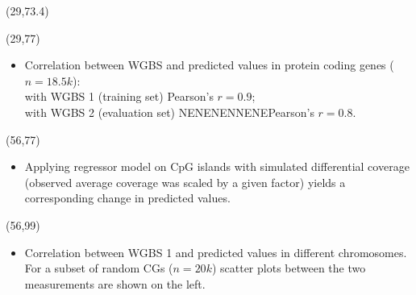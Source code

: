 \documentclass[a0,50pt]{a0poster}
\def\SectionTitle#1{\noindent{\huge\color{fontMain2} #1}}
\begin{document}
    \begin{textblock}{25}(29,73.4)
        \SectionTitle{Results}
    \end{textblock}

    \begin{textblock}{25}(29,77)
        \Large
        \begin{itemize}
            \item Correlation between WGBS and predicted values in protein coding genes ($n = 18.5k$):\\
            with WGBS 1 (training set) Pearson's $r = 0.9$; \\ with WGBS 2 (evaluation set) NENENENNENEPearson's $r = 0.8$.
        \end{itemize}
    \end{textblock}

    \begin{textblock}{25}(56,77)
        \Large
        \begin{itemize}
            \item Applying regressor model on CpG islands with simulated differential coverage (observed average coverage was scaled by a given factor) yields a corresponding change in predicted values.
        \end{itemize}
    \end{textblock}

    \begin{textblock}{25}(56,99)
        \Large
        \begin{itemize}
            \item Correlation between WGBS 1 and predicted values in different chromosomes. For a subset of random CGs ($n = 20k$) scatter plots between the two measurements are shown on the left.
        \end{itemize}
    \end{textblock}
\end{document}
